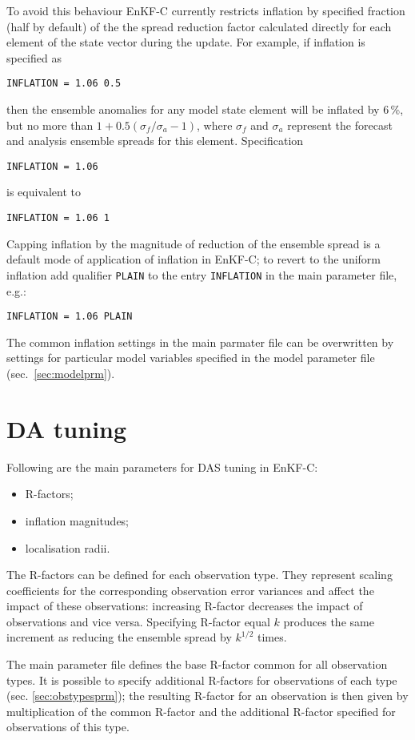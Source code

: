 \documentclass[11pt]{report}
\begin{document}
To avoid this behaviour EnKF-C currently restricts inflation by specified fraction (half by default) of the the spread reduction factor calculated directly for each element of the state vector during the update.
For example, if inflation is specified as
\begin{Verbatim}
INFLATION = 1.06 0.5
\end{Verbatim}
then the ensemble anomalies for any model state element will be inflated by 6\,\%, but no more than $1 + 0.5 (\sigma_f / \sigma_a - 1)$, where $\sigma_f$ and $\sigma_a$ represent the forecast and analysis ensemble spreads for this element.
Specification
\begin{Verbatim}
INFLATION = 1.06
\end{Verbatim}
is equivalent to
\begin{Verbatim}
INFLATION = 1.06 1
\end{Verbatim}
Capping inflation by the magnitude of reduction of the ensemble spread is a default mode of application of inflation in EnKF-C; to revert to the uniform inflation add qualifier \verb|PLAIN| to the entry \verb|INFLATION| in the main parameter file, e.g.:
\begin{Verbatim}
INFLATION = 1.06 PLAIN
\end{Verbatim}
The common inflation settings in the main parmater file can be overwritten by settings for particular model variables specified in the model parameter file (sec.~\ref{sec:modelprm}).

\section{DA tuning}
\label{sec:datuning}

Following are the main parameters for DAS tuning in EnKF-C:
\begin{itemize}
\item R-factors;
\item inflation magnitudes;
\item localisation radii.
\end{itemize}

The R-factors can be defined for each observation type.
They represent scaling coefficients for the corresponding observation error variances and affect the impact of these observations: increasing R-factor decreases the impact of observations and vice versa.
Specifying R-factor equal $k$ produces the same increment as reducing the ensemble spread by $k^{1/2}$ times.

The main parameter file defines the base R-factor common for all observation types.
It is possible to specify additional R-factors for observations of each type (sec. \ref{sec:obstypesprm}); the resulting R-factor for an observation is then given by multiplication of the common R-factor and the additional R-factor specified for observations of this type.
\end{document}
